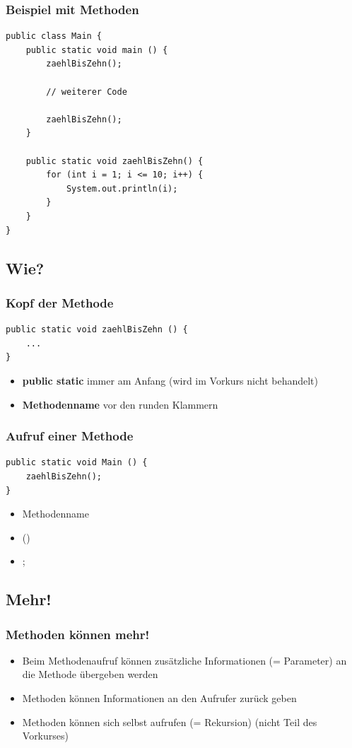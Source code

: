 \documentclass[final]{beamer}
\begin{document}
\begin{frame}[containsverbatim]
	\frametitle{Beispiel mit Methoden}
	\begin{lstlisting}
public class Main {
	public static void main () {
		zaehlBisZehn();
		
		// weiterer Code
		
		zaehlBisZehn();
	}
	
	public static void zaehlBisZehn() {
		for (int i = 1; i <= 10; i++) {
			System.out.println(i);
		}
	}
}
	\end{lstlisting}
\end{frame}

\subsection{Wie?}
\begin{frame}[containsverbatim]
	\frametitle{Kopf der Methode}
	\begin{lstlisting}
public static void zaehlBisZehn () { 
	...
}
	\end{lstlisting}
	\begin{itemize}
		\item{\textbf{public static} immer am Anfang (wird im Vorkurs nicht behandelt)}
		\item{\textbf{Methodenname} vor den runden Klammern}
	\end{itemize}
\end{frame}

\begin{frame}[containsverbatim]
	\frametitle{Aufruf einer Methode}
	\begin{lstlisting}
public static void Main () {
	zaehlBisZehn();
}
	\end{lstlisting}
	\begin{itemize}
		\item{Methodenname}
		\item{()}
		\item{;}
	\end{itemize}
\end{frame}

\subsection{Mehr!}
\begin{frame}
	\frametitle{Methoden können mehr!}
	\begin{itemize}
		\item{Beim Methodenaufruf können zusätzliche Informationen (= Parameter) an die Methode übergeben werden}
		\item{Methoden können Informationen an den Aufrufer zurück geben}
		\item{Methoden können sich selbst aufrufen (= Rekursion) (nicht Teil des Vorkurses)}
	\end{itemize}
\end{frame}
\end{document}
